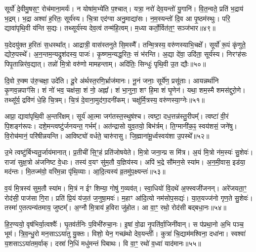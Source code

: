 सूर्यो॑ दे॒वीमु॒षस॒ꣳ॒ रोच॑माना॒मर्यः॑।
न योषा॑म॒भ्ये॑ति प॒श्चात्।
यत्रा॒ नरो॑ देव॒यन्तो॑ यु॒गानि॑।
वि॒त॒न्वते॒ प्रति॑ भ॒द्राय॑ भ॒द्रम्।
भ॒द्रा अश्वा॑ ह॒रितः॒ सूर्य॑स्य।
चि॒त्रा एद॑ग्वा अनु॒माद्या॑सः।
न॒म॒स्यन्तो॑ दि॒व आ पृ॒ष्ठम॑स्थुः।
परि॒ द्यावा॑पृथि॒वी य॑न्ति स॒द्यः।
तथ्सूर्य॑स्य देव॒त्वं तन्म॑हि॒त्वम्।
म॒ध्या कर्तो॒र्वित॑त॒ꣳ॒ सञ्ज॑भार॥४९॥\ip

य॒देदयु॑क्त ह॒रितः॑ स॒धस्था᳚त्।
आद्रात्री॒ वास॑स्तनुते सि॒मस्मै᳚।
तन्मि॒त्रस्य॒ वरु॑णस्याभि॒चक्षे᳚।
सूर्यो॑ रू॒पं कृ॑णुते॒ द्योरु॒पस्थे᳚।
अ॒न॒न्तम॒न्यद्रुश॑दस्य॒ पाजः॑।
कृ॒ष्णम॒न्यद्ध॒रितः॒ सं भ॑रन्ति।
अ॒द्या दे॑वा॒ उदि॑ता॒ सूर्य॑स्य।
निरꣳह॑सः पिपृ॒तान्निर॑व॒द्यात्।
तन्नो॑ मि॒त्रो वरु॑णो मामहन्ताम्।
अदि॑तिः॒ सिन्धुः॑ पृथि॒वी उ॒त द्यौः॥५०॥\ip

दि॒वो रु॒क्म उ॑रु॒चक्षा॒ उदे॑ति।
दू॒रे अ॑र्थस्त॒रणि॒र्भ्राज॑मानः।
नू॒नं जनाः॒ सूर्ये॑ण॒ प्रसू॑ताः।
आयन्नर्था॑नि कृ॒णव॒न्नपाꣳ॑सि।
शं नो॑ भव॒ चक्ष॑सा॒ शं नो॒ अह्ना᳚।
शं भा॒नुना॒ शꣳ हि॒मा शं घृ॒णेन॑।
यथा॒ शम॒स्मै शमस॑द्दुरो॒णे।
तथ्सू᳚र्य॒ द्रवि॑णं धे॒हि चि॒त्रम्।
चि॒त्रं दे॒वाना॒मुद॑गा॒दनी॑कम्।
चक्षु॑र्मि॒त्रस्य॒ वरु॑णस्या॒ग्नेः॥५१॥\ip

आप्रा॒ द्यावा॑पृथि॒वी अ॒न्तरि॑क्षम्।
सूर्य॑ आ॒त्मा जग॑तस्त॒स्थुष॑श्च।
त्वष्टा॒ दध॒त्तन्न॑स्तु॒रीपम्᳚।
त्वष्टा॑ वी॒रं पि॒शङ्ग॑रूपः।
दशे॒मन्त्वष्टु॑र्जनयन्त॒ गर्भम्᳚।
अत॑न्द्रासो युव॒तयो॒ बिभ॑र्त्रम्।
ति॒ग्मानी॑क॒ꣴ॒ स्वय॑शसं॒ जने॑षु।
वि॒रोच॑मानं॒ परि॑षीन्नयन्ति।
आविष्ट्यो॑ वर्धते॒ चारु॑रासु।
जि॒ह्माना॑मू॒र्ध्वस्वय॑शा उ॒पस्थे᳚॥५२॥\ip

उ॒भे त्वष्टु॑र्बिभ्यतु॒र्जाय॑मानात्।
प्र॒तीची॑ सि॒ꣳ॒हं प्रति॑\-जोषयेते।
मि॒त्रो जना॒न्प्र स मि॑त्र।
अ॒यं मि॒त्रो न॑म॒स्यः॑ सु॒शेवः॑।
राजा॑ सुक्ष॒त्रो अ॑जनिष्ट वे॒धाः।
तस्य॑ व॒यꣳ सु॑म॒तौ य॒ज्ञिय॑स्य।
अपि॑ भ॒द्रे सौ॑मन॒से स्या॑म।
अ॒न॒मी॒वास॒ इड॑या॒ मद॑न्तः।
मि॒तज्म॑वो॒ वरि॑म॒न्ना पृ॑थि॒व्याः।
आ॒दि॒त्यस्य॑ व्र॒तमु॑प॒क्ष्यन्तः॑॥५३॥\ip

व॒यं मि॒त्रस्य॑ सुम॒तौ स्या॑म।
मि॒त्रं न ईꣳ शिम्या॒ गोषु॑ ग॒व्यव॑त्।
स्वा॒धियो॑ वि॒दथे॑ अ॒फ्स्वजी॑जनन्।
अरे॑जयता॒ꣳ॒ रोद॑सी॒ पाज॑सा गि॒रा।
प्रति॑ प्रि॒यं य॑ज॒तं ज॒नुषा॒मवः॑।
म॒हाꣳ आ॑दि॒त्यो नम॑सोप॒सद्यः॑।
या॒त॒यज्ज॑नो गृण॒ते सु॒शेवः॑।
तस्मा॑ ए॒तत्पन्य॑तमाय॒ जुष्टम्᳚।
अ॒ग्नौ मि॒त्राय॑ ह॒विरा जु॑होत।
आ वा॒ꣳ॒ रथो॒ रोद॑सी बद्बधा॒नः॥५४॥\ip

हि॒र॒ण्ययो॒ वृष॑भिर्या॒त्वश्वैः᳚।
घृ॒तव॑र्तनिः प॒विभी॑रुचा॒नः।
इ॒षां वो॒ढा नृ॒पति॑र्वा॒जिनी॑वान्।
स प॑प्रथा॒नो अ॒भि पञ्च॒ भूम॑।
त्रि॒व॒न्धु॒रो मन॒साऽऽया॑तु यु॒क्तः।
विशो॒ येन॒ गच्छ॑थो देव॒यन्तीः᳚।
कुत्रा॑ चि॒द्याम॑मश्विना॒ दधा॑ना।
स्वश्वा॑ य॒शसा\-ऽऽया॑तम॒र्वाक्।
दस्रा॑ नि॒धिं मधु॑मन्तं पिबाथः।
वि वा॒ꣳ॒ रथो॑ व॒ध्वा॑ याद॑मानः॥५५॥\ip

